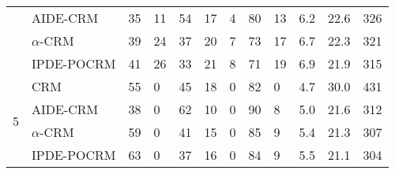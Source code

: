 \begin{tabular*}{\textwidth}{@{\extracolsep\fill}clllllllllll@{\extracolsep\fill}}
 & AIDE-CRM & 35 & 11 & 54 & 17 & 4 & 80 & 13 & 6.2 & 22.6 & 326\\
 & $\alpha$-CRM & 39 & 24 & 37 & 20 & 7 & 73 & 17 & 6.7 & 22.3 & 321\\
 & IPDE-POCRM & 41 & 26 & 33 & 21 & 8 & 71 & 19 & 6.9 & 21.9 & 315\\
\midrule
\multirow{4}{2em}{5} & CRM & 55 & 0 & 45 & 18 & 0 & 82 & 0 & 4.7 & 30.0 & 431\\
 & AIDE-CRM & 38 & 0 & 62 & 10 & 0 & 90 & 8 & 5.0 & 21.6 & 312\\
 & $\alpha$-CRM & 59 & 0 & 41 & 15 & 0 & 85 & 9 & 5.4 & 21.3 & 307\\
 & IPDE-POCRM & 63 & 0 & 37 & 16 & 0 & 84 & 9 & 5.5 & 21.1 & 304\\
\bottomrule
\end{tabular*}
